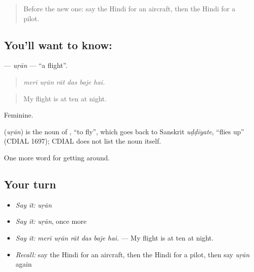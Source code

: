 \label{lesson:HI-C409-uran}



\begin{quote}
Before the new one: say the Hindi for an aircraft, then the Hindi for a pilot.
\end{quote}

\subsection*{You'll want to know: }
\textbf{} — \emph{uṛān} — \textquotedblleft{}a flight\textquotedblright{}.

\begin{quote}
     
\end{quote}

\begin{quote}
\emph{merī uṛān rāt das baje hai.}
\end{quote}

\begin{quote}
My flight is at ten at night.
\end{quote}

Feminine.

\begin{cousinweb}
\textbf{} (\emph{uṛān}) is the noun of , \textquotedblleft{}to fly\textquotedblright{}, which goes back to Sanskrit \emph{uḍḍīyate}, \textquotedblleft{}flies up\textquotedblright{} (CDIAL 1697); CDIAL does not list the noun itself.
\end{cousinweb}

\begin{grammarlens}[title={What you've built}]
One more word for getting around.
\end{grammarlens}

\subsection*{Your turn}
\begin{itemize}
\raggedright
  \item \emph{Say it:} \emph{uṛān}
  \item \emph{Say it:} \emph{uṛān}, once more
  \item \emph{Say it:} \emph{merī uṛān rāt das baje hai.} — My flight is at ten at night.
  \item \emph{Recall:} say the Hindi for an aircraft, then the Hindi for a pilot, then say \emph{uṛān} again
\end{itemize}


